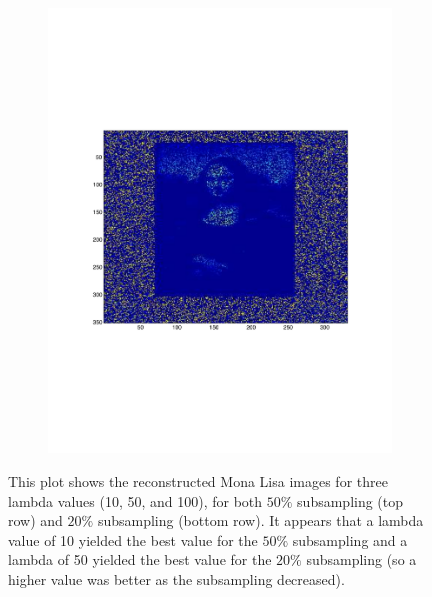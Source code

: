 \begin{figure}[h!tbp]
\begin{subfigure}[f]{0.3\textwidth}
        \includegraphics[width=\textwidth]{img/p5_m2_lam3.pdf}
    \end{subfigure}
    \caption{This plot shows the reconstructed Mona Lisa images for three
    lambda values (10, 50, and 100), for both $50\%$ subsampling (top row) and
    $20\%$ subsampling (bottom row). It appears that a lambda value of 10
    yielded the best value for the $50\%$ subsampling and a lambda of 50
    yielded the best value for the $20\%$ subsampling (so a higher value was
    better as the subsampling decreased).} 
\end{figure}




